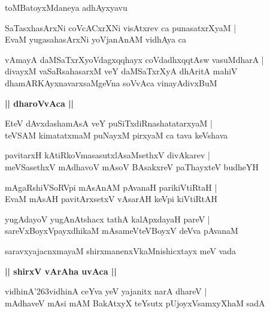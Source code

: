 \documentclass[twoside,12pt,openright]{book}
\def\S{\char'263}
\newcounter{shloka}[chapter]
\def\uvaca#1{\centerline{{\large\textbf{#1}}}}
\begin{document}
\begin{center}
toMBatoyxMdaneya adhAyxyavu
\end{center}

\begin{shloka}%
SaTasxhasArxNi coVcACxrXNi visAtxrev ca punasatxrXyaM |\\
EvaM yugasahasArxNi yoVjanAnAM vidhAya ca 
\end{shloka}

\begin{shloka}%
vAmayA daMSaTxrXyoVdagxqqhayx coVdadhxqqtAsw vasuMdharA |\\
divayxM vaSaRsahasarxM veY daMSaTxrXyA dhAritA mahiV \\
dhamARKAyxnavarxsaMgeVna soVvAca vinayAdivxBuM
\end{shloka}

\uvaca{|| dharoVvAca ||}

\begin{shloka}%
EteV dAvxdashamAsA veY puSiTxdiRnashatatarxyaM |\\
teVSAM kimatatxmaM puNayxM pirxyaM ca tava keVshava 
\end{shloka}

\begin{shloka}%
pavitarxH kAtiRkoVmasasutxlAsaMsethxV divAkarev |\\
meVSasethxV mAdhavoV mAsoV BAsakxreV paThayxteV budheYH
\end{shloka}

\begin{shloka}%
mAgaRshiVSoRVpi mAsAnAM pAvanaH parikiVtiRtaH |\\
EvaM mAsAH pavitArxsetxV vAsarAH keVpi kiVtiRtAH
\end{shloka}

\begin{shloka}%
yugAdayoV yugAnAtshacx tathA kalApxdayaH pareV |\\
sareVxBoyxVpayxdhikaM mAsameVteVBoyxV deVva pAvanaM 
\end{shloka}

\begin{shloka}%
saravxyajacnxmayaM shirxmanenxVkaMnishicxtayx meV vada \\
\end{shloka}

\uvaca{|| shirxV vArAha uvAca ||}

\begin{shloka}%
vidhinA\S vidhinA ceYva yeV yajanitx narA dhareV |\\
mAdhaveV mAsi mAM BakAtxyX teYsutx pUjoyxVsamxyXhaM sadA 
\end{shloka}
\end{document}
